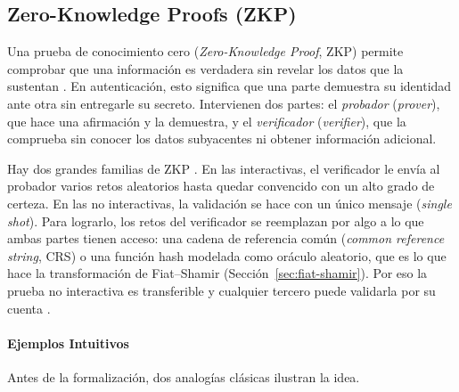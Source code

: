 \subsection{Zero-Knowledge Proofs (ZKP)}
\label{sec:zkp}

Una prueba de conocimiento cero (\textit{Zero-Knowledge Proof}, ZKP) permite comprobar que una información es verdadera sin revelar los datos que la sustentan \cite{mulder2023trends}. En autenticación, esto significa que una parte demuestra su identidad ante otra sin entregarle su secreto. Intervienen dos partes: el \emph{probador} (\textit{prover}), que hace una afirmación y la demuestra, y el \emph{verificador} (\textit{verifier}), que la comprueba sin conocer los datos subyacentes ni obtener información adicional.

Hay dos grandes familias de ZKP \cite{mulder2023trends}. En las interactivas, el verificador le envía al probador varios retos aleatorios hasta quedar convencido con un alto grado de certeza. En las no interactivas, la validación se hace con un único mensaje (\textit{single shot}). Para lograrlo, los retos del verificador se reemplazan por algo a lo que ambas partes tienen acceso: una cadena de referencia común (\textit{common reference string}, CRS) o una función hash modelada como oráculo aleatorio, que es lo que hace la transformación de Fiat--Shamir (Sección~\ref{sec:fiat-shamir}). Por eso la prueba no interactiva es transferible y cualquier tercero puede validarla por su cuenta \cite{mulder2023trends}.
\paragraph{Ejemplos Intuitivos}
Antes de la formalización, dos analogías clásicas ilustran la idea.

